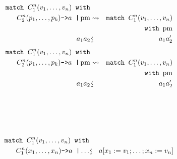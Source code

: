 \documentclass{beamer}
\newcommand{\assign}{:=}
\newcommand{\downsquigarrow}{{\mbox{\rotatebox[origin=c]{-90}{$\rightsquigarrow$}}}}
\newcommand{\tmop}[1]{\ensuremath{\operatorname{#1}}}
\newcommand{\tmverbatim}[1]{\text{{\ttfamily{#1}}}}
\begin{document}
\begin{eqnarray*}
  \text{\tmverbatim{match }} C_1^n (v_1, \ldots, v_n) \text{\tmverbatim{
  with}} &  & \\
  C_2^n (p_1, \ldots, p_k) \text{\tmverbatim{->}} a \text{\tmverbatim{
  \textbar }} \tmop{pm} & \rightsquigarrow & \text{\tmverbatim{match }} C_1^n
  (v_1, \ldots, v_n)\\
  &  & \text{\tmverbatim{with} } \tmop{pm}\\
  a_1 a_2 & \downsquigarrow & a_1 a_2'
\end{eqnarray*}
{\newpage}
\begin{eqnarray*}
  \text{\tmverbatim{match }} C_1^n (v_1, \ldots, v_n) \text{\tmverbatim{
  with}} &  & \\
  C_2^n (p_1, \ldots, p_k) \text{\tmverbatim{->}} a \text{\tmverbatim{
  \textbar }} \tmop{pm} & \rightsquigarrow & \text{\tmverbatim{match }} C_1^n
  (v_1, \ldots, v_n)\\
  &  & \text{\tmverbatim{with} } \tmop{pm}\\
  a_1 a_2 & \downsquigarrow & a_1 a_2'
\end{eqnarray*}
{\hlstd{ \ }}{}{\hlopt{+ }}{\hlopt{(}}{}{}{\hlopt{(}}{}{\hlopt{, }}{}{\hlopt{)
}}{}{\hlendline{}}\\
{\hlstd{ \ }}{\hlopt{ \ \ \ \ \ \ \textbar }}{}{\hlopt{(}}{}{\hlopt{, }}{}{\hlopt{) -> }}{}{\hlopt{+ }}{\hlopt{(}}{}{\hlopt{(}}{}{}{\hlopt{->}}{\hlendline{}}\\
{\hlstd{ \ \ \ \ \ \ \ \ \ \ }}{}{}{}{\hlendline{}}\\
{\hlstd{ \ \ \ \ \ \ \ \ \ \ \ \ }}{\hlopt{\textbar }}{}{\hlopt{->
}}{}{\hlendline{}}\\
{\hlstd{ \ \ \ }}{\hlopt{ \ \ \ \ \ \ \ \ \textbar }}{}{\hlopt{(}}{}{\hlopt{, }}{}{\hlopt{) -> }}{}{\hlopt{+ }}{}{\hlopt{))}}{}{\hlopt{) }}
\begin{eqnarray*}
  \text{\tmverbatim{match }} C_1^n (v_1, \ldots, v_n) \text{\tmverbatim{
  with}} &  & \\
  C_1^n (x_1, \ldots, x_n) \text{\tmverbatim{->}} a \text{\tmverbatim{
  \textbar }} \ldots & \downsquigarrow & a [x_1 \assign v_1 ; \ldots ; x_n
  \assign v_n]\\
  &  & 
\end{eqnarray*}
{\newpage}
\end{document}
